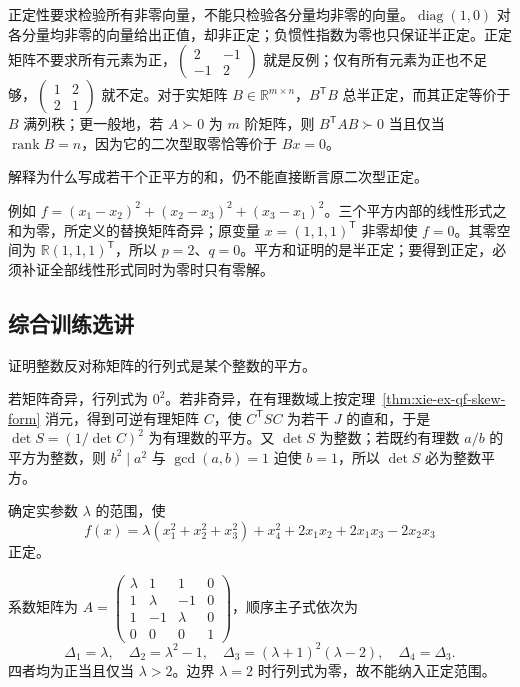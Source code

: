 正定性要求检验所有非零向量，不能只检验各分量均非零的向量。$\operatorname{diag}(1,0)$ 对各分量均非零的向量给出正值，却非正定；负惯性指数为零也只保证半正定。正定矩阵不要求所有元素为正，$\begin{pmatrix}2&-1\\-1&2\end{pmatrix}$ 就是反例；仅有所有元素为正也不足够，$\begin{pmatrix}1&2\\2&1\end{pmatrix}$ 就不定。对于实矩阵 $B\in\mathbb R^{m\times n}$，$B^{\mathsf T}B$ 总半正定，而其正定等价于 $B$ 满列秩；更一般地，若 $A\succ0$ 为 $m$ 阶矩阵，则 $B^{\mathsf T}AB\succ0$ 当且仅当 $\operatorname{rank}B=n$，因为它的二次型取零恰等价于 $Bx=0$。

\begin{example}
\label{ex:xie-ex-qf-dependent-squares}
解释为什么写成若干个正平方的和，仍不能直接断言原二次型正定。
\end{example}
\begin{solve}
例如 $f=(x_1-x_2)^2+(x_2-x_3)^2+(x_3-x_1)^2$。三个平方内部的线性形式之和为零，所定义的替换矩阵奇异；原变量 $x=(1,1,1)^{\mathsf T}$ 非零却使 $f=0$。其零空间为 $\mathbb R(1,1,1)^{\mathsf T}$，所以 $p=2$、$q=0$。平方和证明的是半正定；要得到正定，必须补证全部线性形式同时为零时只有零解。
\end{solve}

\subsection{综合训练选讲}

\begin{example}
证明整数反对称矩阵的行列式是某个整数的平方。
\end{example}
\begin{solve}
若矩阵奇异，行列式为 $0^2$。若非奇异，在有理数域上按定理~\ref{thm:xie-ex-qf-skew-form} 消元，得到可逆有理矩阵 $C$，使 $C^{\mathsf T}SC$ 为若干 $J$ 的直和，于是 $\det S=(1/\det C)^2$ 为有理数的平方。又 $\det S$ 为整数；若既约有理数 $a/b$ 的平方为整数，则 $b^2\mid a^2$ 与 $\gcd(a,b)=1$ 迫使 $b=1$，所以 $\det S$ 必为整数平方。
\end{solve}

\begin{example}
确定实参数 $\lambda$ 的范围，使
\[
 f(x)=\lambda(x_1^2+x_2^2+x_3^2)+x_4^2
       +2x_1x_2+2x_1x_3-2x_2x_3
\]
正定。
\end{example}
\begin{solve}
系数矩阵为 $A=\begin{pmatrix}\lambda&1&1&0\\1&\lambda&-1&0\\1&-1&\lambda&0\\0&0&0&1\end{pmatrix}$，顺序主子式依次为
\[
 \Delta_1=\lambda,\quad \Delta_2=\lambda^2-1,\quad
 \Delta_3=(\lambda+1)^2(\lambda-2),\quad \Delta_4=\Delta_3.
\]
四者均为正当且仅当 $\lambda>2$。边界 $\lambda=2$ 时行列式为零，故不能纳入正定范围。
\end{solve}

